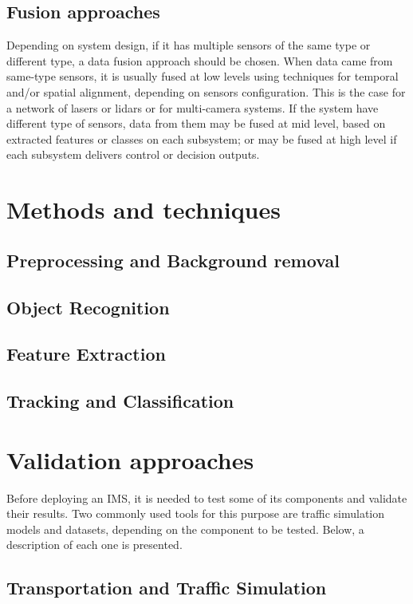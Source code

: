 \subsection{Fusion approaches}

Depending on system design, if it has multiple sensors of the same type or different type, a data fusion approach should be chosen. When data came from same-type sensors, it is usually fused at low levels using techniques for temporal and/or spatial alignment, depending on sensors configuration. This is the case for a network of lasers or lidars or for multi-camera systems. If the system have different type of sensors, data from them may be fused at mid level, based on  extracted features or classes on each subsystem; or may be fused at high level if each subsystem delivers control or decision outputs.

\section{Methods and techniques}

\subsection{Preprocessing and Background removal}
\subsection{Object Recognition}
\subsection{Feature Extraction}
\subsection{Tracking and Classification}

\section{Validation approaches}

Before deploying an IMS, it is needed to test some of its components and validate their results. Two commonly used tools for this purpose are traffic simulation models and datasets, depending on the component to be tested. Below, a description of each one is presented.

\subsection{Transportation and Traffic Simulation}

